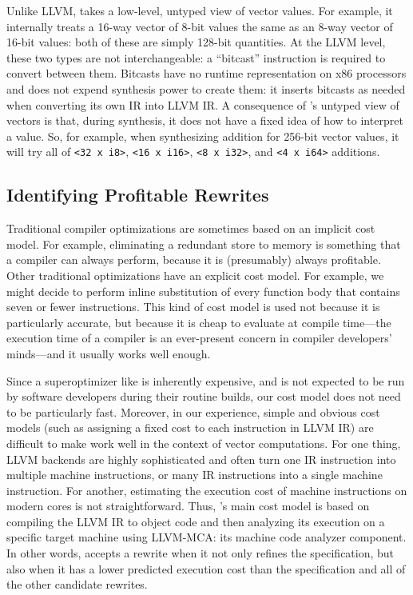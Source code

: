 Unlike LLVM, \tool{} takes a low-level, untyped view of vector values.
%
For example, it internally treats a 16-way vector of 8-bit values the
same as an 8-way vector of 16-bit values: both of these are simply
128-bit quantities.
%
At the LLVM level, these two types are not interchangeable: a
``bitcast'' instruction is required to convert between them.
%
Bitcasts have no runtime representation on x86 processors and \tool{}
does not expend synthesis power to create them: it inserts bitcasts as
needed when converting its own IR into LLVM IR\@.
%
A consequence of \tool's untyped view of vectors is that, during
synthesis, it does not have a fixed idea of how to interpret a value.
%
So, for example, when synthesizing addition for 256-bit vector values,
it will try all of \texttt{<32 x i8>}, \texttt{<16 x i16>},
\texttt{<8 x i32>}, and \texttt{<4 x i64>} additions.


\subsection{Identifying Profitable Rewrites}

Traditional compiler optimizations are sometimes based on an implicit
cost model.
%
For example, eliminating a redundant store to memory is something that
a compiler can always perform, because it is (presumably) always
profitable.
%
Other traditional optimizations have an explicit cost model.
%
For example, we might decide to perform inline substitution of every
function body that contains seven or fewer instructions.
%
This kind of cost model is used not because it is particularly
accurate, but because it is cheap to evaluate at compile time---the
execution time of a compiler is an ever-present concern in compiler
developers' minds---and it usually works well enough.


Since a superoptimizer like \tool{} is inherently expensive, and is
not expected to be run by software developers during their routine
builds, our cost model does not need to be particularly fast.
%
Moreover, in our experience, simple and obvious cost models (such as
assigning a fixed cost to each instruction in LLVM IR) are difficult
to make work well in the context of vector computations.
%
For one thing, LLVM backends are highly sophisticated and often turn
one IR instruction into multiple machine instructions, or many IR
instructions into a single machine instruction.
%
For another, estimating the execution cost of machine instructions on
modern cores is not straightforward.
%
Thus, \tool's main cost model is based on compiling the LLVM IR to
object code and then analyzing its execution on a specific target
machine using LLVM-MCA: its machine code analyzer component.
%
In other words, \tool{} accepts a rewrite when it not only refines the
specification, but also when it has a lower predicted execution cost
than the specification and all of the other candidate rewrites.


